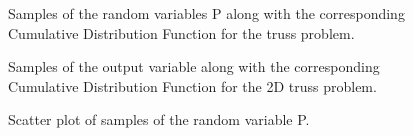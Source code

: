 \begin{figure}[!htbp]
  \caption{Samples of the random variables P along with the corresponding Cumulative Distribution Function for the truss problem. }
  \label{fig:cdfp}
\end{figure}

\begin{figure}[!htbp]
  \caption{Samples of the output variable along with the corresponding Cumulative Distribution Function for the 2D truss problem. }
  \label{fig:cdfoutput}
\end{figure}

\begin{figure}[!htbp]
  \caption{Scatter plot of samples of the random variable P. }
  \label{fig:psamples}
\end{figure}
